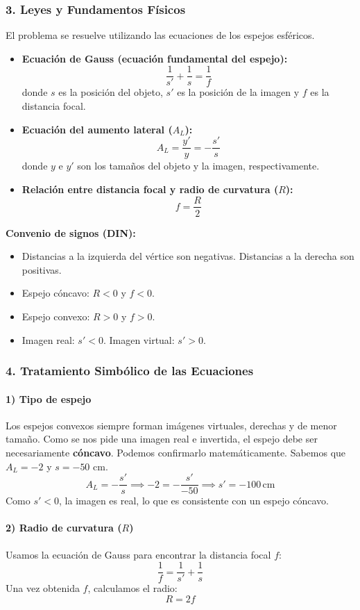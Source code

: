 \subsubsection*{3. Leyes y Fundamentos Físicos}
El problema se resuelve utilizando las ecuaciones de los espejos esféricos.
\begin{itemize}
    \item \textbf{Ecuación de Gauss (ecuación fundamental del espejo):}
    $$\frac{1}{s'} + \frac{1}{s} = \frac{1}{f}$$
    donde $s$ es la posición del objeto, $s'$ es la posición de la imagen y $f$ es la distancia focal.
    \item \textbf{Ecuación del aumento lateral ($A_L$):}
    $$A_L = \frac{y'}{y} = -\frac{s'}{s}$$
    donde $y$ e $y'$ son los tamaños del objeto y la imagen, respectivamente.
    \item \textbf{Relación entre distancia focal y radio de curvatura ($R$):}
    $$f = \frac{R}{2}$$
\end{itemize}
\textbf{Convenio de signos (DIN):}
\begin{itemize}
    \item Distancias a la izquierda del vértice son negativas. Distancias a la derecha son positivas.
    \item Espejo cóncavo: $R < 0$ y $f < 0$.
    \item Espejo convexo: $R > 0$ y $f > 0$.
    \item Imagen real: $s' < 0$. Imagen virtual: $s' > 0$.
\end{itemize}

\subsubsection*{4. Tratamiento Simbólico de las Ecuaciones}
\paragraph*{1) Tipo de espejo}
Los espejos convexos siempre forman imágenes virtuales, derechas y de menor tamaño. Como se nos pide una imagen real e invertida, el espejo debe ser necesariamente \textbf{cóncavo}.
Podemos confirmarlo matemáticamente. Sabemos que $A_L = -2$ y $s = -50$ cm.
$$A_L = -\frac{s'}{s} \implies -2 = -\frac{s'}{-50} \implies s' = -100 \, \text{cm}$$
Como $s' < 0$, la imagen es real, lo que es consistente con un espejo cóncavo.

\paragraph*{2) Radio de curvatura ($R$)}
Usamos la ecuación de Gauss para encontrar la distancia focal $f$:
$$\frac{1}{f} = \frac{1}{s'} + \frac{1}{s}$$
Una vez obtenida $f$, calculamos el radio:
$$R = 2f$$

